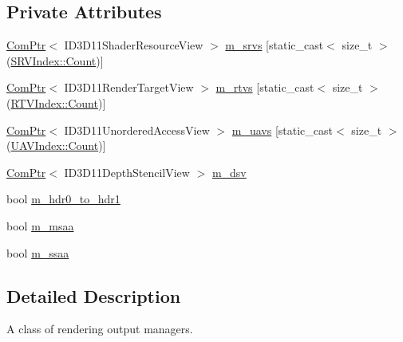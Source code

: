 \subsection*{Private Attributes}
\begin{DoxyCompactItemize}
\item 
\hyperlink{namespacemage_ae74f374780900893caa5555d1031fd79}{Com\+Ptr}$<$ I\+D3\+D11\+Shader\+Resource\+View $>$ \hyperlink{classmage_1_1_rendering_output_manager_af0443196d91297ccaff675a90a69adff}{m\+\_\+srvs} \mbox{[}static\+\_\+cast$<$ size\+\_\+t $>$(\hyperlink{classmage_1_1_rendering_output_manager_ab23ee4985ed0d176479fe796dc3a4cfdae93f994f01c537c4e2f7d8528c3eb5e9}{S\+R\+V\+Index\+::\+Count})\mbox{]}
\item 
\hyperlink{namespacemage_ae74f374780900893caa5555d1031fd79}{Com\+Ptr}$<$ I\+D3\+D11\+Render\+Target\+View $>$ \hyperlink{classmage_1_1_rendering_output_manager_a319f9b33395053ea23be97768410942c}{m\+\_\+rtvs} \mbox{[}static\+\_\+cast$<$ size\+\_\+t $>$(\hyperlink{classmage_1_1_rendering_output_manager_a776a03191e0a424d8e014414d9d44cefae93f994f01c537c4e2f7d8528c3eb5e9}{R\+T\+V\+Index\+::\+Count})\mbox{]}
\item 
\hyperlink{namespacemage_ae74f374780900893caa5555d1031fd79}{Com\+Ptr}$<$ I\+D3\+D11\+Unordered\+Access\+View $>$ \hyperlink{classmage_1_1_rendering_output_manager_ad4e780e6340b18f601a1fcfa9dd1b297}{m\+\_\+uavs} \mbox{[}static\+\_\+cast$<$ size\+\_\+t $>$(\hyperlink{classmage_1_1_rendering_output_manager_a222cae54b40bbb153da0dfa840a37fdbae93f994f01c537c4e2f7d8528c3eb5e9}{U\+A\+V\+Index\+::\+Count})\mbox{]}
\item 
\hyperlink{namespacemage_ae74f374780900893caa5555d1031fd79}{Com\+Ptr}$<$ I\+D3\+D11\+Depth\+Stencil\+View $>$ \hyperlink{classmage_1_1_rendering_output_manager_a3c6290fd9b186fbe56a47adb6d774ccf}{m\+\_\+dsv}
\item 
bool \hyperlink{classmage_1_1_rendering_output_manager_ae2164d5657239162591cdcdefa75e240}{m\+\_\+hdr0\+\_\+to\+\_\+hdr1}
\item 
bool \hyperlink{classmage_1_1_rendering_output_manager_ab28e6451a0c2eb918b63ae312018ffe1}{m\+\_\+msaa}
\item 
bool \hyperlink{classmage_1_1_rendering_output_manager_a944bc441357c9e1b6af74ec5c393fb63}{m\+\_\+ssaa}
\end{DoxyCompactItemize}


\subsection{Detailed Description}
A class of rendering output managers. 

